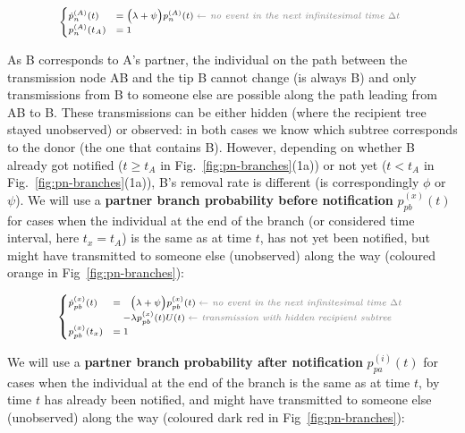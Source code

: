 \documentclass[10pt,letterpaper]{article}
\begin{document}
\begin{equation}
\scriptsize
\begin{cases}
\dot{p}_n^{(A)}(t) &=  \Big(\lambda + \psi\Big) p_n^{(A)}(t)\; \textit{\color{gray} $\leftarrow$ no event in the next infinitesimal time $\Delta t$ }\\
p_n^{(A)}(t_A) &= 1\label{eq:p-n}
\end{cases}
\end{equation}

As B corresponds to A's partner, the individual on the path between the transmission node AB and the tip B cannot change (is always B) and 
only transmissions from B to someone else are possible along the path leading from AB to B. These transmissions can be either hidden (where the recipient tree stayed unobserved) or observed: in both cases we know which subtree corresponds to the donor (the one that contains B). However, depending on whether B already got notified ($t \geq t_A$ in Fig.~\ref{fig:pn-branches}(1a)) or not yet ($t < t_A$ in Fig.~\ref{fig:pn-branches}(1a)), B's removal rate is different (is correspondingly $\phi$ or $\psi$). We will use a \textbf{partner branch probability before notification} $p_{pb}^{(x)}(t)$ for cases when the individual at the end of the branch (or considered time interval, here $t_x=t_A$) is the same as at time $t$, has not yet been notified, but might have transmitted to someone else (unobserved) along the way (coloured orange in Fig~\ref{fig:pn-branches}):

\begin{equation}
\scriptsize
\begin{cases}
\dot{p}_{pb}^{(x)}(t) &=~~  \Big(\lambda + \psi\Big) p_{pb}^{(x)}(t)\; \textit{\color{gray} $\leftarrow$ no event in the next infinitesimal time $\Delta t$ }\\
    &~~~ - \lambda p_{pb}^{(x)}(t)U(t)\;  \textit{\color{gray} $\leftarrow$ transmission with hidden recipient subtree}\\
p_{pb}^{(x)}(t_x) &=  1\label{eq:p-pb}
\end{cases}
\end{equation}

We will use a \textbf{partner branch probability after notification} $p_{pa}^{(i)}(t)$ for cases when the individual at the end of the branch is the same as at time $t$, by time $t$ has already been notified, and might have transmitted to someone else (unobserved) along the way (coloured dark red in Fig~\ref{fig:pn-branches}):
\end{document}
